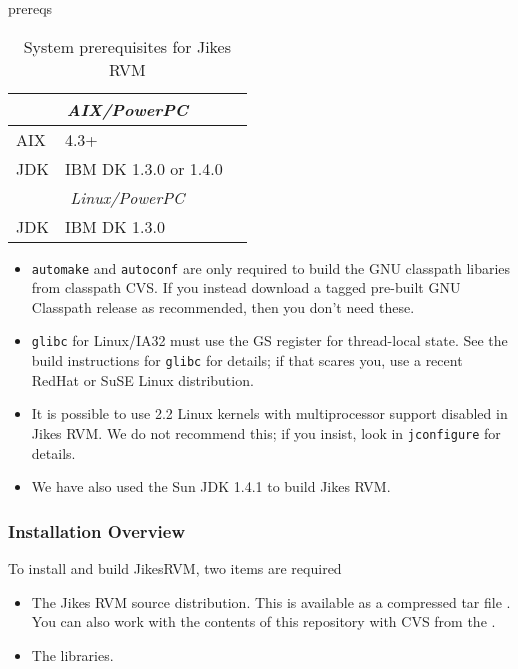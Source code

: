 \begin{Label}{prereqs}
\begin{table}[h]
\begin{center}
\begin{tabular}{|l|l|l|}
\multicolumn{3}{|c|}{\em AIX/PowerPC}                     \\ \hline
AIX            & 4.3+     &                          \\
JDK            & IBM DK 1.3.0 or 1.4.0 & \xlink{\tt \AIXJdkURL}{\AIXJdkURL} \\ \hline
\multicolumn{3}{|c|}{\em Linux/PowerPC}                      \\ \hline
JDK            & IBM DK 1.3.0    & \xlink{\tt \linuxPPCJDKURL}{\linuxPPCJDKURL} \\
\hline\hline 
\end{tabular}
\end{center}
\caption{System prerequisites for Jikes RVM}
\end{table}
\end{Label}

\begin{itemize}
\item {\tt automake} and {\tt autoconf} are only required to build the
GNU classpath libaries from classpath CVS. If you instead download a
tagged pre-built GNU Classpath release as recommended, then you don't need
these.
\item {\tt glibc} for Linux/IA32 must use the GS register for
thread-local state.  See the build instructions for {\tt glibc} for details;
if that scares you, use a recent RedHat or SuSE Linux distribution.

\item It is possible to use 2.2 Linux kernels with multiprocessor
support disabled in Jikes RVM.  We do not recommend this; if you
insist, look in {\tt jconfigure} for details.
\item We have also used the Sun JDK 1.4.1 to build Jikes RVM.
\end{itemize}

\AIXPPCJikesTMFooter

\JavaTMFooter

\subsubsection{Installation Overview}

To install and build Jikes\trademark RVM, two items are required
\begin{itemize}
\item The Jikes RVM source distribution.  This is available as a
compressed tar file {\tt \RVMTarFile}.  You can also work with the
contents of this repository with CVS from the 
.

\item The 
 libraries. 
\end{itemize}


